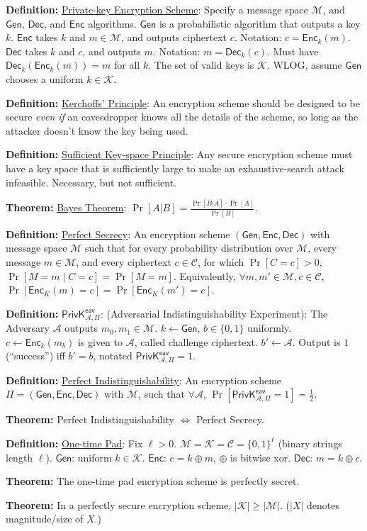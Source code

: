 \documentclass[10pt]{article}
\newcommand{\AAA}{\mathcal{A}}
\newcommand{\CCC}{\mathcal{C}}
\newcommand{\KKK}{\mathcal{K}}
\newcommand{\MMM}{\mathcal{M}}
\newcommand{\defn}[1]{{\bf Definition:} \underline{#1}}
\newcommand{\thm}[1]{{\bf Theorem:} \underline{#1}}
\newcommand{\Enc}{\mathsf{Enc}}
\newcommand{\Dec}{\mathsf{Dec}}
\newcommand{\Gen}{\mathsf{Gen}}
\newcommand{\GenEncDec}{(\Gen,\Enc,\Dec)}
\newcommand{\ExptEavArgs}[2]{\mathsf{PrivK}^{\mathsf{eav}}_{#1,#2}}
\newcommand{\ExptEav}{\ExptEavArgs{\AAA}{\Pi}}
\newcommand{\xor}{\oplus}
\newcommand{\from}{\leftarrow}
\begin{document}
\tiny
\begin{multicols}{5}

\defn{Private-key Encryption Scheme}: Specify a message space $\MMM$, and $\Gen$, $\Dec$, and $\Enc$ algorithms. $\Gen$ is a probabilistic algorithm that outputs a key $k$. $\Enc$ takes $k$ and $m\in\MMM$, and outputs ciphertext $c$. Notation: $c=\Enc_k(m)$. $\Dec$ takes $k$ and $c$, and outputs $m$. Notation: $m=\Dec_k(c)$. Must have $\Dec_k(\Enc_k(m))=m$ for all $k$. The set of valid keys is $\KKK$. WLOG, assume $\Gen$ chooses a uniform $k\in\KKK$.

\defn{Kerchoffs' Principle}: An encryption scheme should be designed to be secure {\it even if} an eavesdropper knows all the details of the scheme, so long as the attacker doesn't know the key being used. 

\defn{Sufficient Key-space Principle}: Any secure encryption scheme must have a key space that is sufficiently large to make an exhaustive-search attack infeasible. Necessary, but not sufficient.

\thm{Bayes Theorem}: $\Pr[A|B]=\frac{\Pr[B|A]\cdot\Pr[A]}{\Pr[B]}$.

\defn{Perfect Secrecy}: An encryption scheme $\GenEncDec$ with message space $\MMM$ such that for every probability distribution over $\MMM$, every message $m\in \MMM$, and every ciphertext $c\in\CCC$, for which $\Pr[C=c]>0$, $\Pr[M=m\mid C=c]=\Pr[M=m]$. Equivalently, $\forall m,m'\in\MMM,c\in\CCC$, $\Pr[\Enc_K(m)=c]=\Pr[\Enc_K(m')=c]$.

\defn{$\ExptEav$}: (Adversarial Indistinguishability Experiment): The Adversary $\AAA$ outputs $m_0,m_1\in\MMM$. $k\from\Gen$, $b\in\{0,1\}$ uniformly. $c\from\Enc_k(m_b)$ is given to $\AAA$, called challenge ciphertext. $b'\from\AAA$. Output is $1$ (``success'') iff $b'=b$, notated $\ExptEav=1$.

\defn{Perfect Indistinguishability}: An encryption scheme $\Pi=\GenEncDec$ with $\MMM$, such that $\forall\AAA$, $\Pr[\ExptEav=1]=\frac{1}{2}$.

\thm{}Perfect Indistinguishability $\Leftrightarrow$ Perfect Secrecy.

\defn{One-time Pad}: Fix $\ell>0$. $\MMM=\KKK=\CCC=\{0,1\}^\ell$ (binary strings length $\ell$). $\Gen$: uniform $k\in\KKK$. $\Enc$: $c=k\xor m$, $\xor$ is bitwise xor. $\Dec$: $m=k\xor c$.

\thm{}The one-time pad encryption scheme is perfectly secret.

\thm{}In a perfectly secure encryption scheme, $|\KKK|\geq|\MMM|$. ($|X|$ denotes magnitude/size of $X$.)


\end{multicols}
\end{document}
